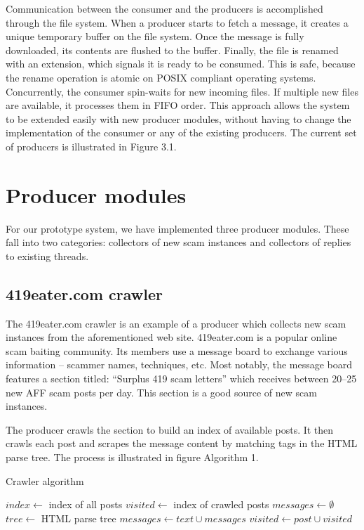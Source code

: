 Communication between the consumer and the producers is accomplished through the file system. When a producer starts to fetch a message, it creates a unique temporary buffer on the file system. Once the message is fully downloaded, its contents are flushed to the buffer. Finally, the file is renamed with an extension, which signals it is ready to be consumed. This is safe, because the rename operation is atomic on POSIX compliant operating systems. Concurrently, the consumer spin-waits for new incoming files. If multiple new files are available, it processes them in FIFO order. This approach allows the system to be extended easily with new producer modules, without having to change the implementation of the consumer or any of the existing producers. The current set of producers is illustrated in Figure 3.1.

\section{Producer modules}
For our prototype system, we have implemented three producer modules. These fall into two categories: collectors of new scam instances and collectors of replies to existing threads.

\subsection{419eater.com crawler}
The 419eater.com crawler is an example of a producer which collects new scam instances from the aforementioned web site. 419eater.com is a popular online scam baiting community. Its members use a message board to exchange various information -- scammer names, techniques, etc. Most notably, the message board features a section titled: ``Surplus 419 scam letters'' which receives between 20--25 new AFF scam posts per day. This section is a good source of new scam instances.

The producer crawls the section to build an index of available posts. It then crawls each post and scrapes the message content by matching tags in the HTML parse tree. The process is illustrated in figure Algorithm 1.

\begin{algorithm}
\caption{Crawler algorithm}
\begin{algorithmic}
\State $index\gets $ index of all posts
\State $visited\gets $ index of crawled posts
\State $messages\gets \emptyset$ 
	\State $tree \gets $ HTML parse tree
			\State $messages \gets text \cup messages$ 
		\EndIf
	\EndFor
	\State $visited \gets post \cup visited$
\EndFor
\end{algorithmic}
\end{algorithm}

